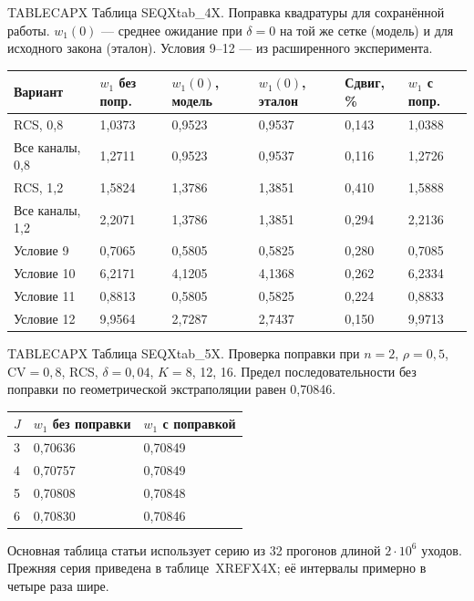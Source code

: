 \noindent TABLECAPX Таблица SEQXtab_4X. Поправка квадратуры для сохранённой работы. \(w_1(0)\) --- среднее ожидание при \(\delta=0\) на той же сетке (модель) и для исходного закона (эталон). Условия 9--12 --- из расширенного эксперимента.\par

\setlength{\tabcolsep}{2pt}
\begin{tabular}{p{4.4cm}p{2.2cm}p{2.2cm}p{2.2cm}p{1.9cm}p{2.2cm}}
\toprule
Вариант & $w_1$ без попр. & $w_1(0)$, модель & $w_1(0)$, эталон & Сдвиг, \% & $w_1$ с попр. \\
\midrule
RCS, 0,8 & 1,0373 & 0,9523 & 0,9537 & 0,143 & 1,0388 \\
Все каналы, 0,8 & 1,2711 & 0,9523 & 0,9537 & 0,116 & 1,2726 \\
RCS, 1,2 & 1,5824 & 1,3786 & 1,3851 & 0,410 & 1,5888 \\
Все каналы, 1,2 & 2,2071 & 1,3786 & 1,3851 & 0,294 & 2,2136 \\
Условие 9 & 0,7065 & 0,5805 & 0,5825 & 0,280 & 0,7085 \\
Условие 10 & 6,2171 & 4,1205 & 4,1368 & 0,262 & 6,2334 \\
Условие 11 & 0,8813 & 0,5805 & 0,5825 & 0,224 & 0,8833 \\
Условие 12 & 9,9564 & 2,7287 & 2,7437 & 0,150 & 9,9713 \\
\bottomrule
\end{tabular}




\noindent TABLECAPX Таблица SEQXtab_5X. Проверка поправки при \(n=2\), \(\rho=0{,}5\), \(\mathrm{CV}=0{,}8\), RCS, \(\delta=0{,}04\), \(K=8\), 12, 16. Предел последовательности без поправки по геометрической экстраполяции равен 0,70846.\par

\setlength{\tabcolsep}{2pt}
\begin{tabular}{p{1.5cm}p{4.0cm}p{4.0cm}}
\toprule
$J$ & $w_1$ без поправки & $w_1$ с поправкой \\
\midrule
3 & 0,70636 & 0,70849 \\
4 & 0,70757 & 0,70849 \\
5 & 0,70808 & 0,70848 \\
6 & 0,70830 & 0,70846 \\
\bottomrule
\end{tabular}




Основная таблица статьи использует серию из 32 прогонов длиной \(2\cdot10^6\) уходов. Прежняя серия приведена в таблице~XREFX4X; её интервалы примерно в четыре раза шире.

